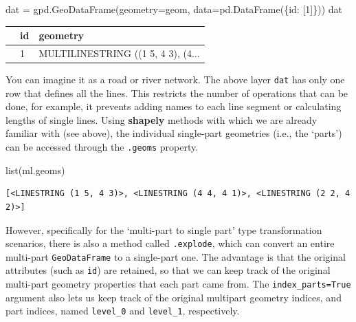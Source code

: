 \documentclass[
  letterpaper,
]{krantz}
\newenvironment{Shaded}{\begin{snugshade}}{\end{snugshade}}
\newcommand{\BuiltInTok}[1]{\textcolor[rgb]{0.00,0.23,0.31}{#1}}
\newcommand{\DecValTok}[1]{\textcolor[rgb]{0.68,0.00,0.00}{#1}}
\newcommand{\NormalTok}[1]{\textcolor[rgb]{0.00,0.23,0.31}{#1}}
\newcommand{\OperatorTok}[1]{\textcolor[rgb]{0.37,0.37,0.37}{#1}}
\newcommand{\StringTok}[1]{\textcolor[rgb]{0.13,0.47,0.30}{#1}}
\begin{document}
\begin{Shaded}
\begin{Highlighting}[]
\NormalTok{dat }\OperatorTok{=}\NormalTok{ gpd.GeoDataFrame(geometry}\OperatorTok{=}\NormalTok{geom, data}\OperatorTok{=}\NormalTok{pd.DataFrame(\{}\StringTok{\textquotesingle{}id\textquotesingle{}}\NormalTok{: [}\DecValTok{1}\NormalTok{]\}))}
\NormalTok{dat}
\end{Highlighting}
\end{Shaded}

\begin{longtable}[]{@{}lll@{}}
\toprule\noalign{}
& id & geometry \\
\midrule\noalign{}
\endhead
\bottomrule\noalign{}
\endlastfoot
0 & 1 & MULTILINESTRING ((1 5, 4 3), (4... \\
\end{longtable}

You can imagine it as a road or river network. The above layer
\texttt{dat} has only one row that defines all the lines. This restricts
the number of operations that can be done, for example, it prevents
adding names to each line segment or calculating lengths of single
lines. Using \textbf{shapely} methods with which we are already familiar
with (see above), the individual single-part geometries (i.e., the
`parts') can be accessed through the \texttt{.geoms} property.

\begin{Shaded}
\begin{Highlighting}[]
\BuiltInTok{list}\NormalTok{(ml.geoms)}
\end{Highlighting}
\end{Shaded}

\begin{verbatim}
[<LINESTRING (1 5, 4 3)>, <LINESTRING (4 4, 4 1)>, <LINESTRING (2 2, 4 2)>]
\end{verbatim}

However, specifically for the `multi-part to single part' type
transformation scenarios, there is also a method called
\texttt{.explode}, which can convert an entire multi-part
\texttt{GeoDataFrame} to a single-part one. The advantage is that the
original attributes (such as \texttt{id}) are retained, so that we can
keep track of the original multi-part geometry properties that each part
came from. The \texttt{index\_parts=True} argument also lets us keep
track of the original multipart geometry indices, and part indices,
named \texttt{level\_0} and \texttt{level\_1}, respectively.
\end{document}
